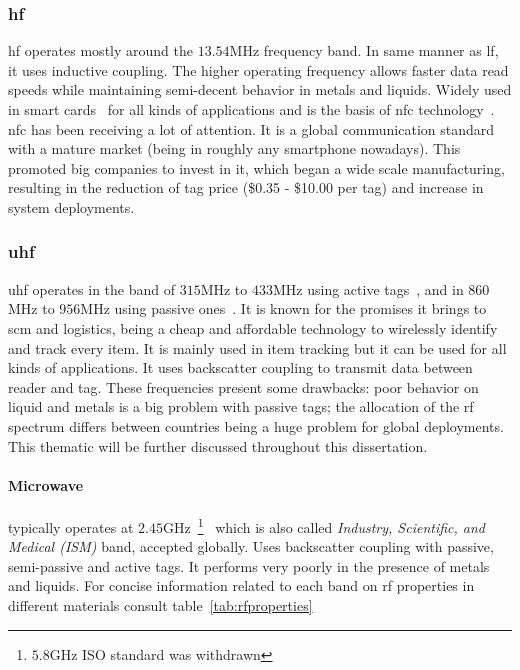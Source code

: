 \subsubsection{\acf{hf}}

\ac{hf} operates mostly around the $13.54$MHz frequency band. In same manner as \ac{lf}, it uses inductive coupling. The higher operating frequency allows faster data read speeds while maintaining semi-decent behavior in metals and liquids.
Widely used in smart cards~\cite{isoISOIEC156932, MIFARE} for all kinds of applications and is the basis of \ac{nfc} technology~\cite{isoISOIEC144434, isoISOIEC180003}. \ac{nfc} has been receiving a lot of attention. It is a global communication standard with a mature market (being in roughly any smartphone nowadays). This promoted big companies to invest in it, which began a wide scale manufacturing, resulting in the reduction of tag price (\$0.35 - \$10.00 per tag) and increase in system deployments.

\subsubsection{\acf{uhf}}

\ac{uhf} operates in the band of $315$MHz to $433$MHz using active tags~\cite{isoISOIEC180007}, and in $860$MHz to $956$MHz using passive ones~\cite{isoISOIEC180006}. It is known for the promises it brings to \ac{scm} and logistics, being a cheap and affordable technology to wirelessly identify and track every item. It is mainly used in item tracking but it can be used for all kinds of applications. It uses backscatter coupling to transmit data between reader and tag. These frequencies present some drawbacks: poor behavior on liquid and metals is a big problem with passive tags; the allocation of the \ac{rf} spectrum differs between countries being a huge problem for global deployments. This thematic will be further discussed throughout this dissertation.

\paragraph*{Microwave} typically operates at $2.45$GHz~\footnote{$5.8$GHz ISO standard was withdrawn}~\cite{isoISOIEC180004} which is also called \emph{Industry, Scientific, and Medical (ISM)} band, accepted globally. Uses backscatter coupling with passive, semi-passive and active tags. It performs very poorly in the presence of metals and liquids.  
For concise information related to each band on \ac{rf} properties in different materials consult table~\ref{tab:rfproperties}

